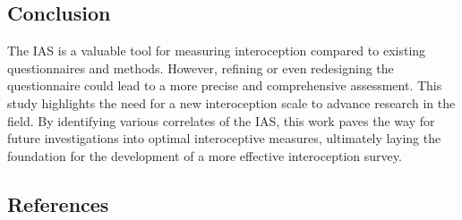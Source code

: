 \documentclass[
  man,
  floatsintext,
  longtable,
  nolmodern,
  notxfonts,
  notimes,
  colorlinks=true,linkcolor=blue,citecolor=blue,urlcolor=blue]{apa7}
\begin{document}
\subsection{Conclusion}\label{conclusion}

The IAS is a valuable tool for measuring interoception compared to
existing questionnaires and methods. However, refining or even
redesigning the questionnaire could lead to a more precise and
comprehensive assessment. This study highlights the need for a new
interoception scale to advance research in the field. By identifying
various correlates of the IAS, this work paves the way for future
investigations into optimal interoceptive measures, ultimately laying
the foundation for the development of a more effective interoception
survey.

\subsection{References}\label{references}
\end{document}
